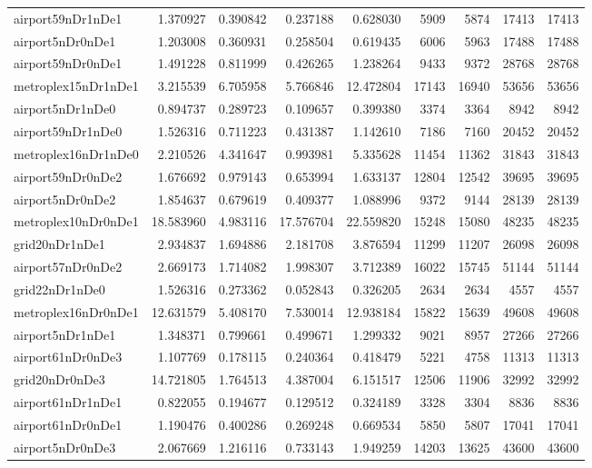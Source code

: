 \begin{longtable}{|l|r|r|r|r|r|r|r|r|}
airport59nDr1nDe1 & 1.370927 & 0.390842 & 0.237188 & 0.628030 & 5909 & 5874 & 17413 & 17413 \\
airport5nDr0nDe1 & 1.203008 & 0.360931 & 0.258504 & 0.619435 & 6006 & 5963 & 17488 & 17488 \\
airport59nDr0nDe1 & 1.491228 & 0.811999 & 0.426265 & 1.238264 & 9433 & 9372 & 28768 & 28768 \\
metroplex15nDr1nDe1 & 3.215539 & 6.705958 & 5.766846 & 12.472804 & 17143 & 16940 & 53656 & 53656 \\
airport5nDr1nDe0 & 0.894737 & 0.289723 & 0.109657 & 0.399380 & 3374 & 3364 & 8942 & 8942 \\
airport59nDr1nDe0 & 1.526316 & 0.711223 & 0.431387 & 1.142610 & 7186 & 7160 & 20452 & 20452 \\
metroplex16nDr1nDe0 & 2.210526 & 4.341647 & 0.993981 & 5.335628 & 11454 & 11362 & 31843 & 31843 \\
airport59nDr0nDe2 & 1.676692 & 0.979143 & 0.653994 & 1.633137 & 12804 & 12542 & 39695 & 39695 \\
airport5nDr0nDe2 & 1.854637 & 0.679619 & 0.409377 & 1.088996 & 9372 & 9144 & 28139 & 28139 \\
metroplex10nDr0nDe1 & 18.583960 & 4.983116 & 17.576704 & 22.559820 & 15248 & 15080 & 48235 & 48235 \\
grid20nDr1nDe1 & 2.934837 & 1.694886 & 2.181708 & 3.876594 & 11299 & 11207 & 26098 & 26098 \\
airport57nDr0nDe2 & 2.669173 & 1.714082 & 1.998307 & 3.712389 & 16022 & 15745 & 51144 & 51144 \\
grid22nDr1nDe0 & 1.526316 & 0.273362 & 0.052843 & 0.326205 & 2634 & 2634 & 4557 & 4557 \\
metroplex16nDr0nDe1 & 12.631579 & 5.408170 & 7.530014 & 12.938184 & 15822 & 15639 & 49608 & 49608 \\
airport5nDr1nDe1 & 1.348371 & 0.799661 & 0.499671 & 1.299332 & 9021 & 8957 & 27266 & 27266 \\
airport61nDr0nDe3 & 1.107769 & 0.178115 & 0.240364 & 0.418479 & 5221 & 4758 & 11313 & 11313 \\
grid20nDr0nDe3 & 14.721805 & 1.764513 & 4.387004 & 6.151517 & 12506 & 11906 & 32992 & 32992 \\
airport61nDr1nDe1 & 0.822055 & 0.194677 & 0.129512 & 0.324189 & 3328 & 3304 & 8836 & 8836 \\
airport61nDr0nDe1 & 1.190476 & 0.400286 & 0.269248 & 0.669534 & 5850 & 5807 & 17041 & 17041 \\
airport5nDr0nDe3 & 2.067669 & 1.216116 & 0.733143 & 1.949259 & 14203 & 13625 & 43600 & 43600 \\

\end{longtable}
